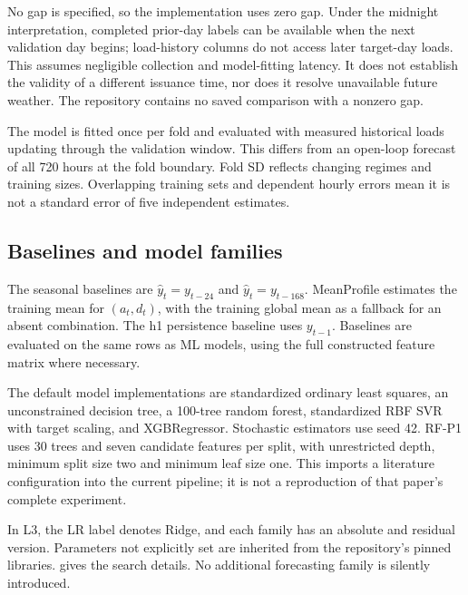 No gap is specified, so the implementation uses zero gap. Under the midnight interpretation, completed prior-day labels can be available when the next validation day begins; load-history columns do not access later target-day loads. This assumes negligible collection and model-fitting latency. It does not establish the validity of a different issuance time, nor does it resolve unavailable future weather. The repository contains no saved comparison with a nonzero gap.

The model is fitted once per fold and evaluated with measured historical loads updating through the validation window. This differs from an open-loop forecast of all 720 hours at the fold boundary. Fold SD reflects changing regimes and training sizes. Overlapping training sets and dependent hourly errors mean it is not a standard error of five independent estimates.

\subsection{Baselines and model families}
The seasonal baselines are $\widehat y_t=y_{t-24}$ and $\widehat y_t=y_{t-168}$. MeanProfile estimates the training mean for $(a_t,d_t)$, with the training global mean as a fallback for an absent combination. The h1 persistence baseline uses $y_{t-1}$. Baselines are evaluated on the same rows as ML models, using the full constructed feature matrix where necessary.

The default model implementations are standardized ordinary least squares, an unconstrained decision tree, a 100-tree random forest, standardized RBF SVR with target scaling, and XGBRegressor. Stochastic estimators use seed 42. RF-P1 uses 30 trees and seven candidate features per split, with unrestricted depth, minimum split size two and minimum leaf size one. This imports a literature configuration into the current pipeline; it is not a reproduction of that paper's complete experiment.

In L3, the LR label denotes Ridge, and each family has an absolute and residual version. Parameters not explicitly set are inherited from the repository's pinned libraries.  gives the search details. No additional forecasting family is silently introduced.

